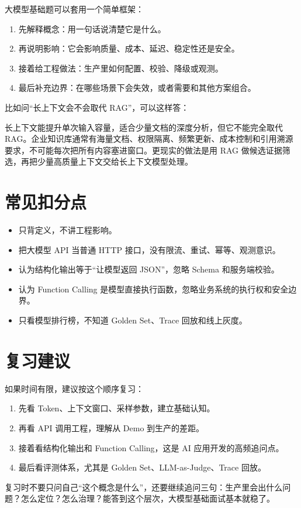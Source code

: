 \documentclass[9pt,a4paper,twocolumn]{ctexart}
\begin{document}
大模型基础题可以套用一个简单框架：


\begin{enumerate}[itemsep=1pt, topsep=2pt]
  \item 先解释概念：用一句话说清楚它是什么。
  \item 再说明影响：它会影响质量、成本、延迟、稳定性还是安全。
  \item 接着给工程做法：生产里如何配置、校验、降级或观测。
  \item 最后补充边界：在哪些场景下会失效，或者需要和其他方案组合。
\end{enumerate}


比如问“长上下文会不会取代 RAG”，可以这样答：



长上下文能提升单次输入容量，适合少量文档的深度分析，但它不能完全取代 RAG。企业知识库通常有海量文档、权限隔离、频繁更新、成本控制和引用溯源要求，不可能每次把所有内容塞进窗口。更现实的做法是用 RAG 做候选证据筛选，再把少量高质量上下文交给长上下文模型处理。



\section*{常见扣分点}

\begin{itemize}[itemsep=1pt, topsep=2pt]
  \item 只背定义，不讲工程影响。
  \item 把大模型 API 当普通 HTTP 接口，没有限流、重试、幂等、观测意识。
  \item 认为结构化输出等于“让模型返回 JSON”，忽略 Schema 和服务端校验。
  \item 认为 Function Calling 是模型直接执行函数，忽略业务系统的执行权和安全边界。
  \item 只看模型排行榜，不知道 Golden Set、Trace 回放和线上灰度。
\end{itemize}


\section*{复习建议}


如果时间有限，建议按这个顺序复习：


\begin{enumerate}[itemsep=1pt, topsep=2pt]
  \item 先看 Token、上下文窗口、采样参数，建立基础认知。
  \item 再看 API 调用工程，理解从 Demo 到生产的差距。
  \item 接着看结构化输出和 Function Calling，这是 AI 应用开发的高频追问点。
  \item 最后看评测体系，尤其是 Golden Set、LLM-as-Judge、Trace 回放。
\end{enumerate}


复习时不要只问自己“这个概念是什么”，还要继续追问三句：生产里会出什么问题？怎么定位？怎么治理？能答到这个层次，大模型基础面试基本就稳了。
\end{document}
